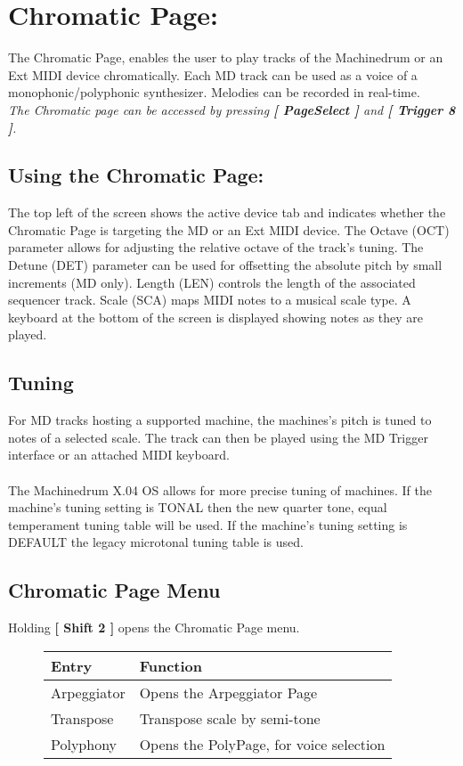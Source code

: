 \chapter{Chromatic Page:}
The Chromatic Page, enables the user to play tracks of the Machinedrum or an Ext MIDI device chromatically. Each MD track can be used as a voice of a monophonic/polyphonic synthesizer. Melodies can be recorded in real-time.
\\
\textit{The Chromatic page can be accessed by pressing \textbf{[ PageSelect ]} and \textbf{[ Trigger 8 ]}.}
\\
\section{Using the Chromatic Page:}
The top left of the screen shows the active device tab and indicates whether the Chromatic Page is targeting the MD or an Ext MIDI device.
The Octave (OCT) parameter allows for adjusting the relative octave of the track's tuning. The Detune (DET) parameter can be used for offsetting the absolute pitch by small increments (MD only). Length (LEN) controls the length of the associated sequencer track. Scale (SCA) maps MIDI notes to a musical scale type.
A keyboard at the bottom of the screen is displayed showing notes as they are played.
\section{Tuning}
For MD tracks hosting a supported machine, the machines’s pitch is tuned to notes of a selected scale. The track can then be played using the MD Trigger interface or an attached MIDI keyboard.\\\\
The Machinedrum X.04 OS allows for more precise tuning of machines. If the machine's tuning setting is TONAL then the new quarter tone, equal temperament tuning table will be used. If the machine's tuning setting is DEFAULT the legacy microtonal tuning table is used.

\section{Chromatic Page Menu}
Holding \textbf{[ Shift 2 ]} opens the Chromatic Page menu.
\begin{figure}[hb]
    \begin{tabular}{|l|l|}
    \hline
    \rowcolor[HTML]{C0C0C0} 
    Entry            & Function \\ \hline
    Arpeggiator      & Opens the Arpeggiator Page \\ \hline
    Transpose        & Transpose scale by semi-tone\\ \hline
    Polyphony        & Opens the PolyPage, for voice selection\\ \hline
    \end{tabular}
\end{figure}
